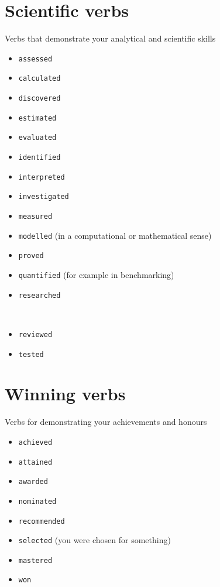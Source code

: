 \documentclass[
]{book}
\providecommand{\tightlist}{%
  \setlength{\itemsep}{0pt}\setlength{\parskip}{0pt}}
\begin{document}
\hypertarget{scientific}{%
\section{Scientific verbs}\label{scientific}}

Verbs that demonstrate your analytical and scientific skills

\begin{itemize}
\tightlist
\item
  \texttt{assessed}
\item
  \texttt{calculated}
\item
  \texttt{discovered}
\item
  \texttt{estimated}
\item
  \texttt{evaluated}
\item
  \texttt{identified}
\item
  \texttt{interpreted}
\item
  \texttt{investigated}
\item
  \texttt{measured}
\item
  \texttt{modelled} (in a computational or mathematical sense)
\item
  \texttt{proved}
\item
  \texttt{quantified} (for example in benchmarking)
\item
  \texttt{researched}\strut \\
\item
  \texttt{reviewed}
\item
  \texttt{tested}
\end{itemize}

\hypertarget{winning}{%
\section{Winning verbs}\label{winning}}

Verbs for demonstrating your achievements and honours

\begin{itemize}
\tightlist
\item
  \texttt{achieved}
\item
  \texttt{attained}
\item
  \texttt{awarded}
\item
  \texttt{nominated}
\item
  \texttt{recommended}
\item
  \texttt{selected} (you were chosen for something)
\item
  \texttt{mastered}
\item
  \texttt{won}
\end{itemize}
\end{document}
